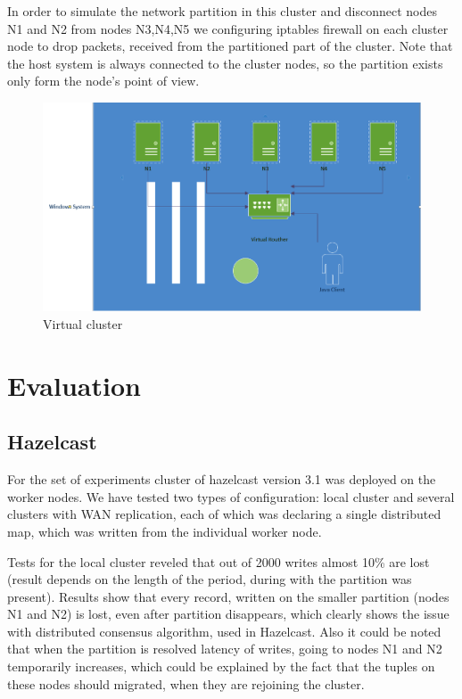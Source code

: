 \documentclass[a4paper]{article}
\begin{document}
In order to simulate the network partition in this cluster and disconnect nodes N1 and N2 from nodes N3,N4,N5 we configuring iptables firewall on each cluster node to drop packets, received from the partitioned part of the cluster.
Note that the host system is always connected to the cluster nodes, so the partition exists only form the node's point of view.

\begin{figure}[h!]
	\centering
	\includegraphics[width=\textwidth]{cluster}
	\caption{Virtual cluster}
	\label{fig:cluster}
\end{figure}

\section{Evaluation}

\subsection{Hazelcast}

For the set of experiments cluster of hazelcast version 3.1 was deployed on the worker nodes. 
We have tested two types of configuration: local cluster and several clusters with WAN replication, each of which was declaring a single distributed map, which was written from the individual worker node.

Tests for the local cluster reveled that out of 2000 writes almost 10\% are lost (result depends on the length of the period, during with the partition was present).
Results show that every record, written on the smaller partition (nodes N1 and N2) is lost, even after partition disappears, which clearly shows the issue with distributed consensus algorithm, used in Hazelcast.
Also it could be noted that when the partition is resolved latency of writes, going to nodes N1 and N2 temporarily increases, which could be explained by the fact that the tuples on these nodes should migrated, when they are rejoining the cluster.
\end{document}
